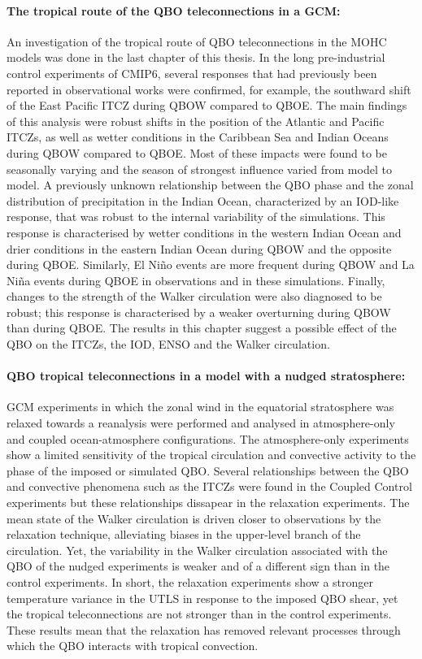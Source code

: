 \paragraph{The tropical route of the QBO teleconnections in a GCM:}
An investigation of the tropical route of QBO teleconnections in the MOHC models was done in the last chapter of this thesis. 
In the long pre-industrial control experiments of CMIP6, several responses that had previously been reported in observational works were confirmed, for example, the southward shift of the East Pacific ITCZ during QBOW compared to QBOE. 
The main findings of this analysis were robust shifts in the position of the Atlantic and Pacific ITCZs, as well as wetter conditions in the Caribbean Sea and Indian Oceans during QBOW compared to QBOE. 
Most of these impacts were found to be seasonally varying and the season of strongest influence varied from model to model. 
A previously unknown relationship between the QBO phase and the zonal distribution of precipitation in the Indian Ocean, characterized by an IOD-like response, that was robust to the internal variability of the simulations. 
This response is characterised by wetter conditions in the western Indian Ocean and drier conditions in the eastern Indian Ocean during QBOW and the opposite during QBOE. 
Similarly, El Niño events are more frequent during QBOW and La Niña events during QBOE in observations and in these simulations.
Finally, changes to the strength of the Walker circulation were also diagnosed to be robust; this response is characterised by a weaker overturning during QBOW than during QBOE. 
The results in this chapter suggest a possible effect of the QBO on the ITCZs, the IOD, ENSO and the Walker circulation. 

\paragraph{QBO tropical teleconnections in a model with a nudged stratosphere:}
GCM experiments in which the zonal wind in the equatorial stratosphere was relaxed towards a reanalysis were performed and analysed in atmosphere-only and coupled ocean-atmosphere configurations. 
The atmosphere-only experiments show a limited sensitivity of the tropical circulation and convective activity to the phase of the imposed or simulated QBO.
Several relationships between the QBO and convective phenomena such as the ITCZs were found in the Coupled Control experiments but these relationships dissapear in the relaxation experiments.
The mean state of the Walker circulation is driven closer to observations by the relaxation technique, alleviating biases in the upper-level branch of the circulation. Yet, the variability in the Walker circulation associated with the QBO of the nudged experiments is weaker and of a different sign than in the control experiments.
In short, the relaxation experiments show a stronger temperature variance in the UTLS in response to the imposed QBO shear, yet the tropical teleconnections are not stronger than in the control experiments. These results mean that the relaxation has removed relevant processes through which the QBO interacts with tropical convection.


